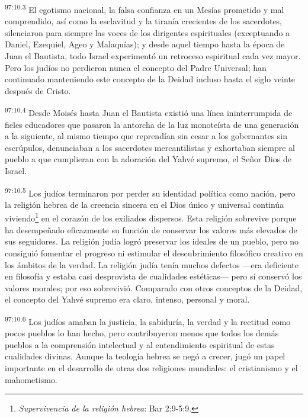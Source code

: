 \par
\textsuperscript{97:10.3} El egotismo nacional, la falsa confianza en un Mesías prometido y mal comprendido, así como la esclavitud y la tiranía crecientes de los sacerdotes, silenciaron para siempre las voces de los dirigentes espirituales (exceptuando a Daniel, Ezequiel, Ageo y Malaquías); y desde aquel tiempo hasta la época de Juan el Bautista, todo Israel experimentó un retroceso espiritual cada vez mayor. Pero los judíos no perdieron nunca el concepto del Padre Universal; han continuado manteniendo este concepto de la Deidad incluso hasta el siglo veinte después de Cristo.

\par
\textsuperscript{97:10.4} Desde Moisés hasta Juan el Bautista existió una línea ininterrumpida de fieles educadores que pasaron la antorcha de la luz monoteísta de una generación a la siguiente, al mismo tiempo que reprendían sin cesar a los gobernantes sin escrúpulos, denunciaban a los sacerdotes mercantilistas y exhortaban siempre al pueblo a que cumplieran con la adoración del Yahvé supremo, el Señor Dios de Israel.

\par
\textsuperscript{97:10.5} Los judíos terminaron por perder su identidad política como nación, pero la religión hebrea de la creencia sincera en el Dios único y universal continúa viviendo\footnote{\textit{Supervivencia de la religión hebrea}: Bar 2:9-5:9.} en el corazón de los exiliados dispersos. Esta religión sobrevive porque ha desempeñado eficazmente su función de conservar los valores más elevados de sus seguidores. La religión judía logró preservar los ideales de un pueblo, pero no consiguió fomentar el progreso ni estimular el descubrimiento filosófico creativo en los ámbitos de la verdad. La religión judía tenía muchos defectos ---era deficiente en filosofía y estaba casi desprovista de cualidades estéticas--- pero sí conservó los valores morales; por eso sobrevivió. Comparado con otros conceptos de la Deidad, el concepto del Yahvé supremo era claro, intenso, personal y moral.

\par
\textsuperscript{97:10.6} Los judíos amaban la justicia, la sabiduría, la verdad y la rectitud como pocos pueblos lo han hecho, pero contribuyeron menos que todos los demás pueblos a la comprensión intelectual y al entendimiento espiritual de estas cualidades divinas. Aunque la teología hebrea se negó a crecer, jugó un papel importante en el desarrollo de otras dos religiones mundiales: el cristianismo y el mahometismo.

